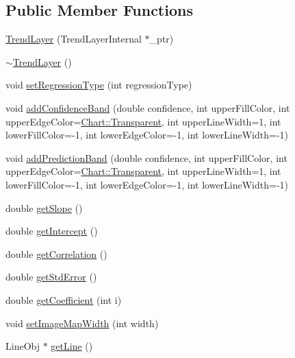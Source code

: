 \subsection*{Public Member Functions}
\begin{DoxyCompactItemize}
\item 
\hyperlink{class_trend_layer_a2114c97aaf3fdf29a5dd62676563d456}{Trend\+Layer} (Trend\+Layer\+Internal $\ast$\+\_\+ptr)
\item 
\hyperlink{class_trend_layer_a046cc9cb64ea314e189fe679b68a0168}{$\sim$\+Trend\+Layer} ()
\item 
void \hyperlink{class_trend_layer_aa32739ea081068795e269705701ce944}{set\+Regression\+Type} (int regression\+Type)
\item 
void \hyperlink{class_trend_layer_a9fb641824e98e2626bd8ee253c5f906b}{add\+Confidence\+Band} (double confidence, int upper\+Fill\+Color, int upper\+Edge\+Color=\hyperlink{namespace_chart_abee0d882fdc9ad0b001245ad9fc64011afc6811800a9e2582dac0157b6279f836}{Chart\+::\+Transparent}, int upper\+Line\+Width=1, int lower\+Fill\+Color=-\/1, int lower\+Edge\+Color=-\/1, int lower\+Line\+Width=-\/1)
\item 
void \hyperlink{class_trend_layer_a9d6da57188ba79e09d52cd8064a9a6fb}{add\+Prediction\+Band} (double confidence, int upper\+Fill\+Color, int upper\+Edge\+Color=\hyperlink{namespace_chart_abee0d882fdc9ad0b001245ad9fc64011afc6811800a9e2582dac0157b6279f836}{Chart\+::\+Transparent}, int upper\+Line\+Width=1, int lower\+Fill\+Color=-\/1, int lower\+Edge\+Color=-\/1, int lower\+Line\+Width=-\/1)
\item 
double \hyperlink{class_trend_layer_a58989a5b0fc6ed23b5bb7433f792bc6c}{get\+Slope} ()
\item 
double \hyperlink{class_trend_layer_aed613d07e0863cacf976363ea5fe739f}{get\+Intercept} ()
\item 
double \hyperlink{class_trend_layer_a588bb389e19585344439f85423c614fc}{get\+Correlation} ()
\item 
double \hyperlink{class_trend_layer_a73c024bd734f3c65bfe706afab186bfe}{get\+Std\+Error} ()
\item 
double \hyperlink{class_trend_layer_a7ff42064c53aefd537e89fdc66e9bf79}{get\+Coefficient} (int i)
\item 
void \hyperlink{class_trend_layer_af0bec09b9dd8ed3fea44cd133addd76a}{set\+Image\+Map\+Width} (int width)
\item 
Line\+Obj $\ast$ \hyperlink{class_trend_layer_ad608d20a7d52b0262ceb0476e1db4a41}{get\+Line} ()
\end{DoxyCompactItemize}
